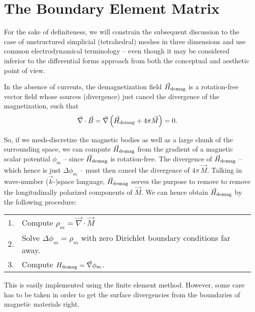 \documentclass{article}
\newcommand{\Laplace}{\Delta}
\begin{document}
\section{The Boundary Element Matrix}

For the sake of definiteness, we will constrain the subsequent
discussion to the case of unstructured simplicial (tetrahedral) meshes
in three dimensions and use common electrodynamical terminology --
even though it may be considered inferior to the differential forms
approach from both the conceptual and aesthetic point of view.

In the absence of currents, the demagnetization field $\vec H_{\rm
demag}$ is a rotation-free vector field whose sources (divergence)
just cancel the divergence of the magnetization, such that
\begin{equation}
\vec{\nabla} \cdot \vec{B} = \vec{\nabla}\left(\vec{H}_{\rm demag}+4\pi\vec{M}\right)=0.
\end{equation}


So, if we mesh-discretize the magnetic bodies as well as a large chunk
of the surrounding space, we can compute $\vec H_{\rm demag}$ from the
gradient of a magnetic scalar potential $\phi_m$ -- since $\vec H_{\rm
demag}$ is rotation-free. The divergence of $\vec H_{\rm demag}$ --
which hence is just $\Laplace\phi_m$ -- must then cancel the
divergence of $4\pi\,\vec M$. Talking in wave-number ($\vec k$-)space
language, $\vec H_{\rm demag}$ serves the purpose to remove to remove
the longitudinally polarized components of $\vec M$. We can hence
obtain $\vec H_{\rm demag}$ by the following procedure:
%

\begin{tabular}{ll}
1. & Compute $\rho_m = \vec\nabla\cdot\vec M$\\
2. & Solve $\Laplace\phi_m = \rho_m$ with zero Dirichlet boundary conditions far away.\\
3. & Compute $H_{\rm demag}=\vec\nabla \phi_m$.
\end{tabular}

%
This is easily implemented using the finite element method. However,
some care has to be taken in order to get the surface divergencies
from the boundaries of magnetic materials right.
\end{document}
